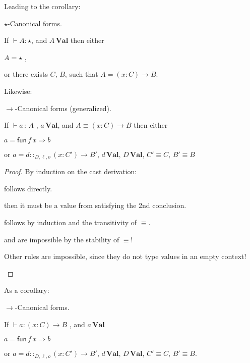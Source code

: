 Leading to the corollary:

\begin{cor} $\star$-Canonical forms.
 
If $\vdash A:\star$, and $A\,\textbf{Val}$ then either

\textup{$A=\star$ , }

\textup{or there exists $C$, $B$, such that $A=\left(x:C\right)\rightarrow B$.}
\end{cor}
 
Likewise:

\begin{lem} $\rightarrow$-Canonical forms (generalized).
 
If $\vdash a\,:\,A$ , $a\,\textbf{Val}$, and $A\equiv\left(x:C\right)\rightarrow B$ then either
 
$a=\mathsf{fun}\,f\,x\Rightarrow b$
 
or $a=d::_{D,\ell ,o}\left(x:C'\right)\rightarrow B'$, $d\,\textbf{Val}$, $D\,\textbf{Val}$, $C'\equiv C$, $B'\equiv B$
\end{lem}
\begin{proof}
By induction on the cast derivation:
\begin{casenv}
 \item {} follows directly.
 \item {} then it must be a value from  satisfying the 2nd conclusion.
 \item {} follows by induction and the transitivity of $\equiv$.
 
 \item {} and  are impossible by the stability of $\equiv$!
 \item Other rules are impossible, since they do not type values in an empty context!
\end{casenv}
\end{proof}

As a corollary:

\begin{cor} $\rightarrow$-Canonical forms.
 
If $\vdash a:\left(x:C\right)\rightarrow B$ , and $a\,\textbf{Val}$
 
$a=\mathsf{fun}\,f\,x\Rightarrow b$
 
or $a=d::_{D,\ell ,o}\left(x:C'\right)\rightarrow B'$, $d\,\textbf{Val}$, $D\,\textbf{Val}$, $C'\equiv C$, $B'\equiv B$.
\end{cor}
 
